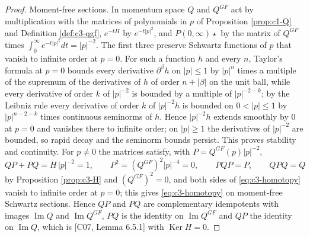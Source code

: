 \begin{proof}
Moment-free sections. In momentum space $Q$ and $Q^{GF}$ act by multiplication with the matrices of polynomials in $p$ of Proposition \ref{prop:c1-Q} and Definition \ref{def:c3-qgf}, $e^{-tH}$ by $e^{-t|p|^2}$, and $P(0,\infty)\star$ by the matrix of $Q^{GF}$ times $\int_0^\infty e^{-t|p|^2}dt=|p|^{-2}$. The first three preserve Schwartz functions of $p$ that vanish to infinite order at $p=0$. For such a function $h$ and every $n$, Taylor's formula at $p=0$ bounds every derivative $\partial^\beta h$ on $|p|\le1$ by $|p|^n$ times a multiple of the supremum of the derivatives of $h$ of order $n+|\beta|$ on the unit ball, while every derivative of order $k$ of $|p|^{-2}$ is bounded by a multiple of $|p|^{-2-k}$; by the Leibniz rule every derivative of order $k$ of $|p|^{-2}h$ is bounded on $0<|p|\le1$ by $|p|^{n-2-k}$ times continuous seminorms of $h$. Hence $|p|^{-2}h$ extends smoothly by $0$ at $p=0$ and vanishes there to infinite order; on $|p|\ge1$ the derivatives of $|p|^{-2}$ are bounded, so rapid decay and the seminorm bounds persist. This proves stability and continuity. For $p\neq0$ the matrices satisfy, with $P=Q^{GF}(p)|p|^{-2}$,
\[
QP+PQ=H\,|p|^{-2}=1,\qquad P^2=(Q^{GF})^2|p|^{-4}=0,\qquad PQP=P,\qquad QPQ=Q
\]
by Proposition \ref{prop:c3-H} and $(Q^{GF})^2=0$, and both sides of \eqref{eq:c3-homotopy} vanish to infinite order at $p=0$; this gives \eqref{eq:c3-homotopy} on moment-free Schwartz sections. Hence $QP$ and $PQ$ are complementary idempotents with images $\operatorname{Im}Q$ and $\operatorname{Im}Q^{GF}$, $PQ$ is the identity on $\operatorname{Im}Q^{GF}$ and $QP$ the identity on $\operatorname{Im}Q$, which is [C07, Lemma 6.5.1] with $\operatorname{Ker}H=0$.


\end{proof}
